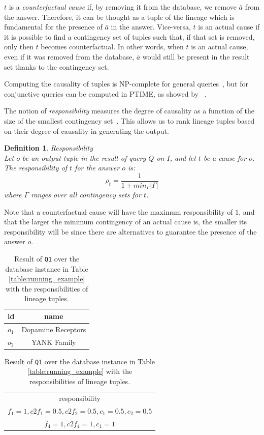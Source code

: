 \documentclass[preprint,12pt,sort&compress]{elsarticle}
\newtheorem{definition}{Definition}[section]
\begin{document}
{$t$ is a \emph{counterfactual cause} if, by removing it from the database, we remove $\bar{a}$ from the answer. Therefore, it can be thought as a tuple of the lineage which is fundamental for the presence of $\bar{a}$ in the answer.
Vice-versa, $t$ is an actual cause if it is possible to find a contingency set of tuples such that, if that set is removed, only then $t$ becomes counterfactual. In other words, when $t$ is an actual cause, even if it was removed from the database, $\bar{a}$ would still be present in the result set thanks to the contingency set. }

Computing the causality of tuples is NP-complete for general queries~\cite{EiterL02}, but for conjunctive queries can be computed in PTIME, as showed by ~\citet{MeliouGMS11}. 


The notion of \emph{responsibility}  measures the degree of causality as a function of the size of the smallest contingency set~\cite{ChocklerH04}. This  allows us to rank lineage tuples based on their degree of causality in generating the output. 

\begin{definition}{Responsibility \cite{MeliouGMS11}}\\
\label{def:responsibility}
	Let $o$ be an output tuple in the result of query $Q$ on $I$, and let $t$ be a cause for $o$. The \emph{responsibility} of $t$ for the answer $o$ is:
	\[
		\rho_t = \frac{1}{1 + min_\Gamma|\Gamma|}
	\]
	where $\Gamma$ ranges over all contingency sets for $t$.
\end{definition}

Note that a counterfactual cause will have the maximum responsibility of $1$, and that the larger the minimum contingency of an actual cause is, the smaller its responsibility will be since there are alternatives to  guarantee the presence of the answer $o$.


\begin{table}[]
\footnotesize
\centering
  \begin{tabular}{|l|c|}
  \hline
    id & name\\
    \hline
    $o_1$ &  Dopamine Receptors\\
    $o_2$ & YANK Family\\
    \hline
  \end{tabular}
  \begin{tabular}{c}
  	responsibility   \\
  	$f_1=1, c2f_1=0.5, c2f_2=0.5, c_1=0.5, c_2=0.5$ \\
  	$f_4=1, c2f_4=1, c_1=1$ \\
  \end{tabular}
    \caption{Result of \texttt{Q1} over the database instance in Table \ref{table:running_example} with the responsibilities of lineage tuples.}
  \label{table:result_responsibility}
\end{table} 
\end{document}
